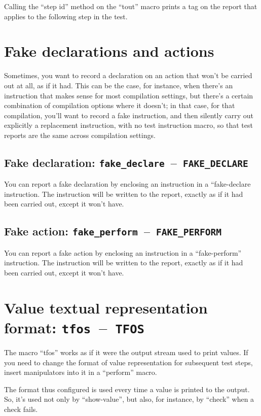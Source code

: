 \documentclass[twoside, a4paper, article]{memoir}
\newcommand*\testudocolor{\color{red!80!blue}}
\newcommand*\testudo[1]{\texttt{\testudocolor{}#1}}
\newcommand*\testudopair[2]{\testudo{#1}~--~\testudo{#2}}
\newcommand\sectiontestudopair[3]{%
  \section[#1]{#1: \testudopair{#2}{#3}}}
\newcommand\subsectiontestudopair[3]{%
  \subsection[#1]{#1: \testudopair{#2}{#3}}}
\newcommand\typesetexample[1]{%
  \typesetexamplesource{#1}
}
\newcommand\typesetexampleandreport[1]{%
  \typesetexamplesource{#1}
  \typesetexamplereport{#1}
}
\providecommand\typesetexamplereport[1]{%
}
\providecommand\typesetexamplesource[1]{%
}
\begin{document}
Calling the ``step id'' method on the ``tout'' macro prints a tag on the report
that applies to the following step in the test.

\typesetexampleandreport{step-id}


\section{Fake declarations and actions}
\label{sec:fake-declarations-actions}

Sometimes, you want to record a declaration on an action that won't be carried
out at all, as if it had.  This can be the case, for instance, when there's an
instruction that makes sense for most compilation settings, but there's a
certain combination of compilation options where it doesn't; in that case, for
that compilation, you'll want to record a fake instruction, and then silently
carry out explicitly a replacement instruction, with no test instruction macro,
so that test reports are the same across compilation settings.

\subsectiontestudopair{Fake declaration}{fake\_declare}{FAKE\_DECLARE}
\label{sec:fake-declaration}

You can report a fake declaration by enclosing an instruction in a
``fake-declare instruction.  The instruction will be written to the report,
exactly as if it had been carried out, except it won't have.

\typesetexample{fake-declare}


\subsectiontestudopair{Fake action}{fake\_perform}{FAKE\_PERFORM}
\label{sec:fake-action}

You can report a fake action by enclosing an instruction in a ``fake-perform''
instruction.  The instruction will be written to the report, exactly as if it
had been carried out, except it won't have.

\typesetexample{fake-perform}


\sectiontestudopair{Value textual representation format}%
  {tfos}{TFOS}
\label{sec:value-textual-representation-format}

The macro ``tfos'' works as if it were the output stream used to print values.
If you need to change the format of value representation for subsequent test
steps, insert manipulators into it in a ``perform'' macro.

\typesetexampleandreport{tfos}

The format thus configured is used every time a value is printed to the output.
So, it's used not only by ``show-value'', but also, for instance, by ``check''
when a check fails.
\end{document}

